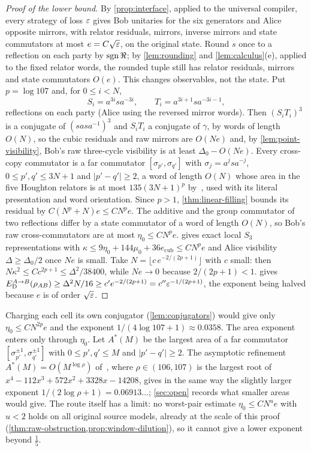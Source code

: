 \begin{proof}[Proof of the lower bound]
By \cref{prop:interface}, applied to the universal compiler, every strategy of loss $\varepsilon$ gives Bob unitaries for the six
generators and Alice opposite mirrors, with relator residuals, mirrors, inverse mirrors and state commutators at most
$e=C\sqrt{\varepsilon}$, on the original state. Round $s$ once to a reflection on each party by $\operatorname{sgn}\Re$; by \cref{lem:rounding} and
\cref{lem:calculus}(e), applied to the fixed relator words, the rounded tuple still has relator residuals, mirrors and state
commutators $O(e)$. This changes observables, not the state. Put $p=\log107$ and, for $0\le i<N$,
\[
S_i=a^{3i}sa^{-3i},\qquad T_i=a^{3i+1}sa^{-3i-1},
\]
reflections on each party (Alice using the reversed mirror words). Then $(S_iT_i)^3$ is a conjugate of $(sasa^{-1})^3$ and
$S_iT_i$ a conjugate of $\gamma$, by words of length $O(N)$, so the cubic residuals and raw mirrors are $O(Ne)$ and, by
\cref{lem:point-visibility}, Bob's raw three-cycle visibility is at least $\Delta_0-O(Ne)$. Every cross-copy commutator is a far
commutator $[\sigma_{p'},\sigma_{q'}]$ with $\sigma_j=a^jsa^{-j}$, $0\le p',q'\le3N+1$ and $|p'-q'|\ge2$, a word of length $O(N)$
whose area in the five Houghton relators is at most $135(3N+1)^p$ by~\cite[Theorem~3.2]{DM-H3}, used with its literal presentation
and word orientation. Since $p>1$, \cref{thm:linear-filling} bounds its residual by $C(N^p+N)e\le CN^pe$. The additive and the group
commutator of two reflections differ by a state commutator of a word of length $O(N)$, so Bob's raw cross-commutators are at most
$\eta_0\le CN^pe$.  gives exact local $S_3$ representations with
$\kappa\le9\eta_0+144\mu_0+36e_{\mathrm{cub}}\le CN^pe$ and Alice visibility $\Delta\ge\Delta_0/2$ once $Ne$ is small. Take
$N=\lfloor c\,e^{-2/(2p+1)}\rfloor$ with $c$ small: then $N\kappa^2\le Cc^{2p+1}\le\Delta^2/38400$, while $Ne\to0$ because
$2/(2p+1)<1$.  gives $E_{\mathrm D}^{A\to B}(\rho_{AB})\ge\Delta^2N/16\ge c'e^{-2/(2p+1)}=c''\varepsilon^{-1/(2p+1)}$, the exponent
being halved because $e$ is of order $\sqrt{\varepsilon}$.
\end{proof}

Charging each cell its own conjugator (\cref{lem:conjugators}) would give only $\eta_0\le CN^{2p}e$ and the exponent
$1/(4\log107+1)\approx0.0358$. The area exponent enters only through $\eta_0$. Let $A^*(M)$ be the largest area of a far
commutator $[\sigma_{p'}^{\pm1},\sigma_{q'}^{\pm1}]$ with $0\le p',q'\le M$ and $|p'-q'|\ge2$. The asymptotic refinement
$A^*(M)=O(M^{\log\rho})$ of~\cite[Remark~A.3]{DM-H3}, where $\rho\in(106,107)$ is the largest root of
$x^4-112x^3+572x^2+3328x-14208$, gives in the same way the slightly larger exponent $1/(2\log\rho+1)=0.06913\ldots$;
\cref{sec:open} records what smaller areas would give. The route itself has a limit: no worst-pair estimate $\eta_0\le CN^ue$ with
$u<2$ holds on all original source models, already at the scale of this proof (\cref{thm:raw-obstruction,prop:window-dilution}), so
it cannot give a lower exponent beyond $\frac15$.

